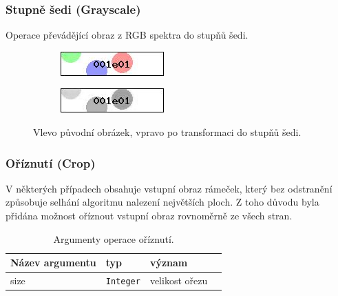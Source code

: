 \documentclass[
  field=ainfp,
  master=true,
  biblatex,
  sourcecodes=false,
  theorems=false,
  glossaries,
  index
]{kidiplom}
\begin{document}
\subsubsection*{Stupně šedi (Grayscale)}
Operace převádějící obraz z RGB spektra do stupňů šedi.
\begin{figure}[H]
\centering
\begin{subfigure}{.5\textwidth}
  \centering
  \includegraphics[width=.8\linewidth]{images/grayscale_original.jpg}
\end{subfigure}%
\begin{subfigure}{.5\textwidth}
  \centering
  \includegraphics[width=.8\linewidth]{images/grayscale_result.png}
\end{subfigure}
\caption{Vlevo původní obrázek, vpravo po transformaci do stupňů šedi.}
\label{fig:crop_example}
\end{figure}

\subsubsection*{Oříznutí (Crop)}
V některých případech obsahuje vstupní obraz rámeček, který bez odstranění způsobuje selhání algoritmu nalezení největších ploch. Z toho důvodu byla přidána možnost oříznout vstupní obraz rovnoměrně ze všech stran.

\begin{table}[H]
\centering
\begin{tabular}{|l|l|l|l|}
\hline
\textbf{Název argumentu} & \textbf{typ} & \textbf{význam}
\\ \hline
size & \texttt{Integer} & velikost ořezu
\\ \hline
\end{tabular}
\caption{Argumenty operace oříznutí.}
\end{table}
\end{document}

